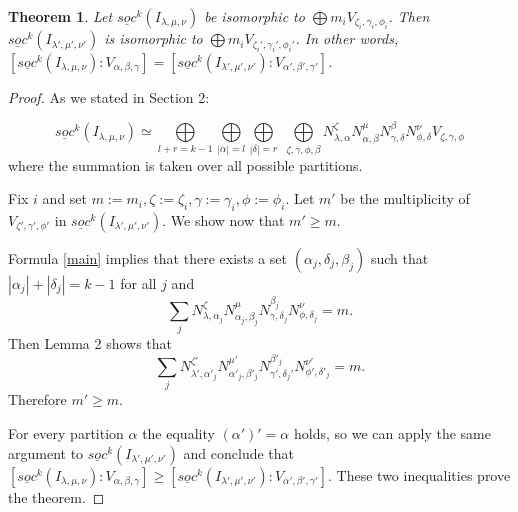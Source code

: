 \documentclass[letterpaper,11pt]{article}
\newtheorem{theorem}{Theorem}
\begin{document}
	\begin{theorem}
		Let $\underline{soc}^k(I_{\lambda, \mu, \nu})$ be isomorphic to $\bigoplus m_i V_{\zeta_i, \gamma_i, \phi_i}$. Then $\underline{soc}^k(I_{\lambda', \mu', \nu'})$ is isomorphic to $\bigoplus m_i V_{\zeta_i', \gamma_i', \phi_i'}$. 
		In other words, $[\underline{soc}^k(I_{\lambda, \mu, \nu}):V_{\alpha, \beta, \gamma}]=[\underline{soc}^k(I_{\lambda', \mu', \nu'}):V_{\alpha', \beta', \gamma'}]$.
	\end{theorem}
	\begin{proof}
		As we stated in Section 2:
		
			\begin{equation*}
			\underline{soc}^k(I_{\lambda, \mu, \nu}) \simeq \underset{l+r=k-1}{\bigoplus} \underset{|\alpha| = l}{\bigoplus} \underset{|\delta| = r}{\bigoplus} \,\, \underset{\zeta, \gamma ,\phi, \beta}{\bigoplus} N_{\lambda, \alpha}^\zeta N_{\alpha, \beta}^\mu N_{\gamma, \delta}^\beta N_{\phi, \delta}^\nu V_{\zeta, \gamma, \phi}
			\end{equation*}
			where the summation is taken over all possible partitions.
			
			Fix $i$ and set $m:=m_i, \zeta := \zeta_i, \gamma := \gamma_i, \phi:=\phi_i$. Let $m'$ be the multiplicity of $V_{\zeta', \gamma', \phi'}$ in $\underline{soc}^k(I_{\lambda', \mu', \nu'})$. We show now that $m' \ge m$.  
			
			Formula \eqref{main} implies that there exists a set $(\alpha_j, \delta_j, \beta_j)$ such that $|\alpha_j|+|\delta_j|=k-1$ for all $j$ and 
			\begin{equation*}
				\sum_{j}^{}N_{\lambda, \alpha_j}^\zeta N_{\alpha_j, \beta_j}^\mu N_{\gamma, \delta_j}^{\beta_j} N_{\phi, \delta_j}^\nu=m.
			\end{equation*}
			Then Lemma 2 shows that 
			\begin{equation*}
				\sum_{j}^{}N_{\lambda', \alpha'_j}^{\zeta'} N_{\alpha'_j, \beta'_j}^{\mu'} N_{\gamma', \delta_j'}^{\beta'_j} N_{\phi', \delta'_j}^{\nu'}=m.
			\end{equation*}
			Therefore $m' \ge m$.
			
			For every partition $\alpha$ the equality $(\alpha')'=\alpha$ holds, so we  can apply the same argument to $\underline{soc}^k(I_{\lambda', \mu', \nu'})$  and conclude that $[\underline{soc}^k(I_{\lambda, \mu, \nu}):V_{\alpha, \beta, \gamma}] \ge [\underline{soc}^k(I_{\lambda', \mu', \nu'}):V_{\alpha', \beta', \gamma'}]$.
			These two inequalities prove the theorem.
	\end{proof}
\end{document}
